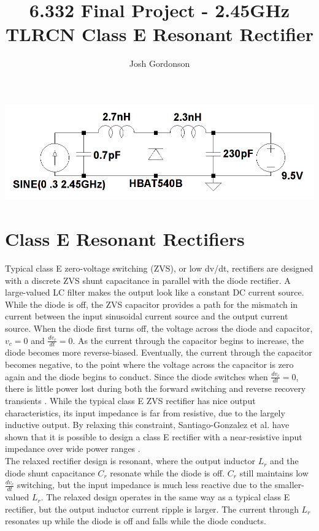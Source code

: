 \documentclass[11pt, a4paper]{article}
\title{6.332 Final Project - 2.45GHz TLRCN Class E Resonant Rectifier}
\author{Josh Gordonson}
\begin{document}
\maketitle

\begin{center}
\includegraphics[width=.7\textwidth]{img/simple-schem.png}
\end{center}

\section{Class E Resonant Rectifiers}

Typical class E zero-voltage switching (ZVS), or low dv/dt, rectifiers are designed with a discrete ZVS shunt capacitance in parallel with the diode rectifier.
A large-valued LC filter makes the output look like a constant DC current source.  
While the diode is off, the ZVS capacitor provides a path for the mismatch in current between the input sinusoidal current source and the output current source.  
When the diode first turns off, the voltage across the diode and capacitor, $v_c=0$ and $\frac{dv_c}{dt}=0$.  
As the current through the capacitor begins to increase, the diode becomes more reverse-biased.  
Eventually, the current through the capacitor becomes negative, to the point where the voltage across the capacitor is zero again and the diode begins to conduct.  
Since the diode switches when $\frac{dv_c}{dt}=0$, there is little power lost during both the forward switching and reverse recovery transients \cite{kaz}.  
While the typical class E ZVS rectifier has nice output characteristics, its input impedance is far from resistive, due to the largely inductive output.  
By relaxing this constraint, Santiago-Gonzalez et al. have shown that it is possible to design a class E rectifier with a near-resistive input impedance over wide power ranges \cite{santiago}. \\

The relaxed rectifier design is resonant, where the output inductor $L_r$ and the diode shunt capacitance $C_r$ resonate while the diode is off.  
$C_r$ still maintains low $\frac{dv_c}{dt}$ switching, but the input impedance is much less reactive due to the smaller-valued $L_r$.  
The relaxed design operates in the same way as a typical class E rectifier, but the output inductor current ripple is larger.  
The current through $L_r$ resonates up while the diode is off and falls while the diode conducts.  \\
\end{document}
